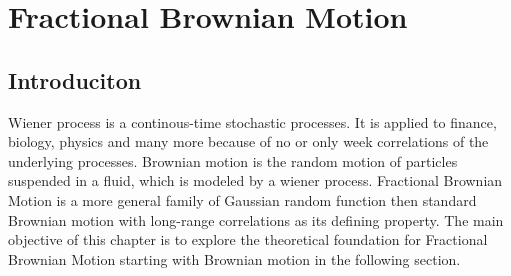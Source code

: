 \documentclass[
  a4paper,BCOR10mm,oneside,
  bibtotoc,idxtotoc,
  headsepline,footsepline,%
  fleqn,openbib
]{scrbook}
\begin{document}
\chapter{Fractional Brownian Motion}
\section{Introduciton}
Wiener process is a continous-time stochastic processes. It is applied to finance, biology, physics and many more because of no or only week correlations of the underlying processes. Brownian motion is the random motion of particles suspended in a fluid, which is modeled by a wiener process.   
Fractional Brownian Motion is a more general family of Gaussian random function then standard Brownian motion with long-range correlations as its defining property. The main objective of this chapter is to explore the theoretical foundation for Fractional Brownian Motion starting with Brownian motion in the following section. 
\end{document}
